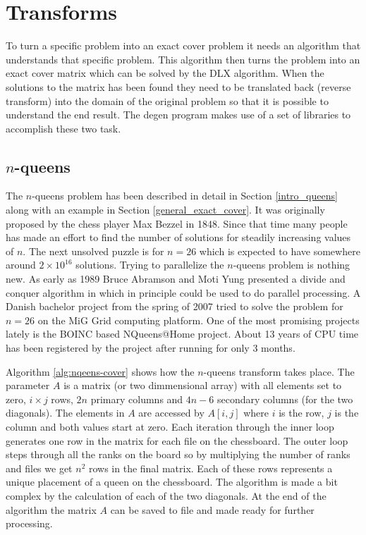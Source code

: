


\section{Transforms}
\label{transforms}

To turn a specific problem into an exact cover problem it needs an algorithm that understands that specific problem.
This algorithm then turns the problem into an exact cover matrix which can be solved by the DLX algorithm.
When the solutions to the matrix has been found they need to be translated back (reverse transform) into the domain of the original problem so that it is possible to understand the end result.
The degen program makes use of a set of libraries to accomplish these two task.


\subsection{\texorpdfstring{$n$}{n}-queens}
\label{queens_trans}

The $n$-queens problem has been described in detail in Section \ref{intro_queens} along with an example in Section \ref{general_exact_cover}.
It was originally proposed by the chess player Max Bezzel in 1848.
Since that time many people has made an effort to find the number of solutions for steadily increasing values of $n$.
The next unsolved puzzle is for $n = 26$ which is expected to have somewhere around $2 \times 10^{16}$ solutions.
Trying to parallelize the $n$-queens problem is nothing new.
As early as 1989 Bruce Abramson and Moti Yung presented a divide and conquer algorithm in \cite{Abramson89} which in principle could be used to do parallel processing.
A Danish bachelor project from the spring of 2007 \cite{queens-mig} tried to solve the problem for $n=26$ on the MiG \cite{mig} Grid computing platform.
One of the most promising projects lately is the BOINC based NQueens@Home \cite{nqueensathome} project.
About 13 years of CPU time has been registered by the project after running for only 3 months.

Algorithm \ref{alg:nqeens-cover} shows how the $n$-queens transform takes place.
The parameter $A$ is a matrix (or two dimmensional array) with all elements set to zero, $i \times j$ rows, $2n$ primary columns and $4n - 6$ secondary columns (for the two diagonals).
The elements in $A$ are accessed by $A[i,j]$ where $i$ is the row, $j$ is the column and both values start at zero.
Each iteration through the inner loop generates one row in the matrix for each file on the chessboard.
The outer loop steps through all the ranks on the board so by multiplying the number of ranks and files we get $n^2$ rows in the final matrix.
Each of these rows represents a unique placement of a queen on the chessboard.
The algorithm is made a bit complex by the calculation of each of the two diagonals.
At the end of the algorithm the matrix $A$ can be saved to file and made ready for further processing.

